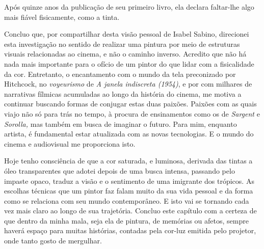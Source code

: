 Após quinze anos da publicação de seu primeiro livro, ela declara
faltar-lhe algo mais fiável fisicamente, como a tinta.

Concluo que, por compartilhar desta visão pessoal de Isabel Sabino,
direcionei esta investigação no sentido de realizar uma pintura por
meio de estruturas visuais relacionadas ao cinema, e não o caminho
inverso. Acredito que não há nada mais importante para o ofício de um
pintor do que lidar com a fisicalidade da cor. Entretanto, o
encantamento com o mundo da tela preconizado por Hitchcock, no
\emph{voyeurismo} de \emph{A janela indiscreta (1954)}, e por com
milhares de narrativas fílmicas acumuladas ao longo da história do
cinema, me motiva a continuar buscando formas de conjugar estas duas
paixões. Paixões com as quais viajo não só para trás no tempo, à
procura de ensinamentos como os de \emph{Sargent} e \emph{Sorolla,} mas
também em busca de imaginar o futuro. Para mim, enquanto artista, é
fundamental estar atualizada com as novas tecnologias. E o mundo do
cinema e audiovisual me proporciona isto.

Hoje tenho consciência de que a cor saturada, e luminosa, derivada das
tintas a óleo transparentes que adotei depois de uma busca intensa,
passando pelo impaste opaco, traduz a visão e o sentimento de uma
imigrante dos trópicos. As escolhas técnicas que um pintor faz falam
muito da sua vida pessoal e da forma como se relaciona com seu mundo
contemporâneo. E isto vai se tornando cada vez mais claro ao longo de
sua trajetória. Concluo este capítulo com a certeza de que dentro da
minha mala, seja ela de pintura, de memórias ou afetos, sempre haverá
espaço para muitas histórias, contadas pela cor-luz emitida pelo
projetor, onde tanto gosto de mergulhar.
